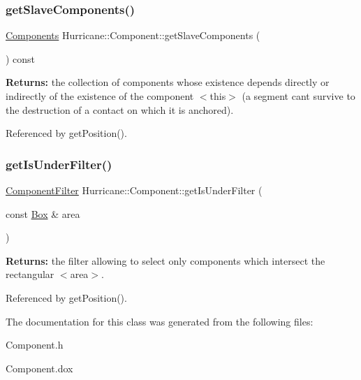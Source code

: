 \subsubsection{\texorpdfstring{get\+Slave\+Components()}{getSlaveComponents()}}
{\footnotesize\ttfamily \hyperlink{namespaceHurricane_a7d26d99aeb5dd6d70d51bd35d2473e72}{Components} Hurricane\+::\+Component\+::get\+Slave\+Components (\begin{DoxyParamCaption}{ }\end{DoxyParamCaption}) const}

{\bfseries Returns\+:} the collection of components whose existence depends directly or indirectly of the existence of the component {\ttfamily $<$this$>$} (a segment can\textquotesingle{}t survive to the destruction of a contact on which it is anchored). 

Referenced by get\+Position().

\mbox{\label{classHurricane_1_1Component_a8680f2756892366db8642bfcfd7ce097}} 
\subsubsection{\texorpdfstring{get\+Is\+Under\+Filter()}{getIsUnderFilter()}}
{\footnotesize\ttfamily \hyperlink{namespaceHurricane_acbfacb3aada84aa054e587817f204e90}{Component\+Filter} Hurricane\+::\+Component\+::get\+Is\+Under\+Filter (\begin{DoxyParamCaption}\item[{const \hyperlink{classHurricane_1_1Box}{Box} \&}]{area }\end{DoxyParamCaption})\hspace{0.3cm}{\ttfamily [static]}}

{\bfseries Returns\+:} the filter allowing to select only components which intersect the rectangular {\ttfamily $<$area$>$}. 

Referenced by get\+Position().



The documentation for this class was generated from the following files\+:\begin{DoxyCompactItemize}
\item 
Component.\+h\item 
Component.\+dox\end{DoxyCompactItemize}
